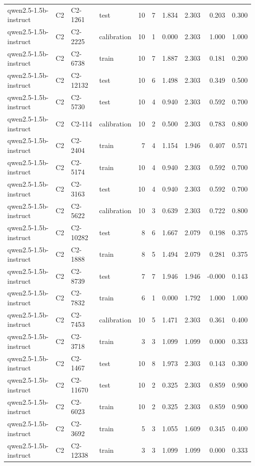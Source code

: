 \begin{table}
\begin{tabular}{llllrrrrrr}
qwen2.5-1.5b-instruct & C2 & C2-1261 & test & 10 & 7 & 1.834 & 2.303 & 0.203 & 0.300 \\
qwen2.5-1.5b-instruct & C2 & C2-2225 & calibration & 10 & 1 & 0.000 & 2.303 & 1.000 & 1.000 \\
qwen2.5-1.5b-instruct & C2 & C2-6738 & train & 10 & 7 & 1.887 & 2.303 & 0.181 & 0.200 \\
qwen2.5-1.5b-instruct & C2 & C2-12132 & test & 10 & 6 & 1.498 & 2.303 & 0.349 & 0.500 \\
qwen2.5-1.5b-instruct & C2 & C2-5730 & test & 10 & 4 & 0.940 & 2.303 & 0.592 & 0.700 \\
qwen2.5-1.5b-instruct & C2 & C2-114 & calibration & 10 & 2 & 0.500 & 2.303 & 0.783 & 0.800 \\
qwen2.5-1.5b-instruct & C2 & C2-2404 & train & 7 & 4 & 1.154 & 1.946 & 0.407 & 0.571 \\
qwen2.5-1.5b-instruct & C2 & C2-5174 & train & 10 & 4 & 0.940 & 2.303 & 0.592 & 0.700 \\
qwen2.5-1.5b-instruct & C2 & C2-3163 & test & 10 & 4 & 0.940 & 2.303 & 0.592 & 0.700 \\
qwen2.5-1.5b-instruct & C2 & C2-5622 & calibration & 10 & 3 & 0.639 & 2.303 & 0.722 & 0.800 \\
qwen2.5-1.5b-instruct & C2 & C2-10282 & test & 8 & 6 & 1.667 & 2.079 & 0.198 & 0.375 \\
qwen2.5-1.5b-instruct & C2 & C2-1888 & train & 8 & 5 & 1.494 & 2.079 & 0.281 & 0.375 \\
qwen2.5-1.5b-instruct & C2 & C2-8739 & test & 7 & 7 & 1.946 & 1.946 & -0.000 & 0.143 \\
qwen2.5-1.5b-instruct & C2 & C2-7832 & train & 6 & 1 & 0.000 & 1.792 & 1.000 & 1.000 \\
qwen2.5-1.5b-instruct & C2 & C2-7453 & calibration & 10 & 5 & 1.471 & 2.303 & 0.361 & 0.400 \\
qwen2.5-1.5b-instruct & C2 & C2-3718 & train & 3 & 3 & 1.099 & 1.099 & 0.000 & 0.333 \\
qwen2.5-1.5b-instruct & C2 & C2-1467 & test & 10 & 8 & 1.973 & 2.303 & 0.143 & 0.300 \\
qwen2.5-1.5b-instruct & C2 & C2-11670 & test & 10 & 2 & 0.325 & 2.303 & 0.859 & 0.900 \\
qwen2.5-1.5b-instruct & C2 & C2-6023 & train & 10 & 2 & 0.325 & 2.303 & 0.859 & 0.900 \\
qwen2.5-1.5b-instruct & C2 & C2-3692 & train & 5 & 3 & 1.055 & 1.609 & 0.345 & 0.400 \\
qwen2.5-1.5b-instruct & C2 & C2-12338 & train & 3 & 3 & 1.099 & 1.099 & 0.000 & 0.333 \\

\end{tabular}
\end{table}
